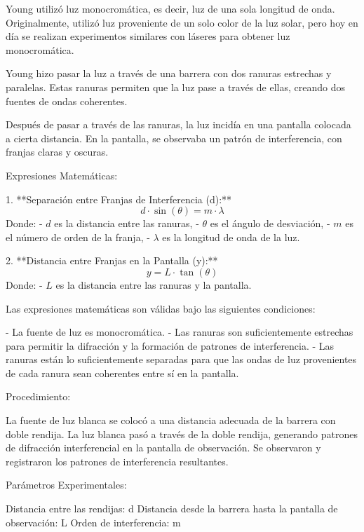 \documentclass[a4paper,12pt]{article}
\begin{document}
    Young utilizó luz monocromática, es decir, luz de una sola longitud de onda. Originalmente, utilizó luz proveniente de un solo color de la luz solar, pero hoy en día se realizan experimentos similares con láseres para obtener luz monocromática.

    Young hizo pasar la luz a través de una barrera con dos ranuras estrechas y paralelas. Estas ranuras permiten que la luz pase a través de ellas, creando dos fuentes de ondas coherentes.

    Después de pasar a través de las ranuras, la luz incidía en una pantalla colocada a cierta distancia. En la pantalla, se observaba un patrón de interferencia, con franjas claras y oscuras.

Expresiones Matemáticas:

1. **Separación entre Franjas de Interferencia (d):**
   \[ d \cdot \sin(\theta) = m \cdot \lambda \]
   Donde:
   - \( d \) es la distancia entre las ranuras,
   - \( \theta \) es el ángulo de desviación,
   - \( m \) es el número de orden de la franja,
   - \( \lambda \) es la longitud de onda de la luz.

2. **Distancia entre Franjas en la Pantalla (y):**
   \[ y = L \cdot \tan(\theta) \]
   Donde:
   - \( L \) es la distancia entre las ranuras y la pantalla.

Las expresiones matemáticas son válidas bajo las siguientes condiciones:

- La fuente de luz es monocromática.
- Las ranuras son suficientemente estrechas para permitir la difracción y la formación de patrones de interferencia.
- Las ranuras están lo suficientemente separadas para que las ondas de luz provenientes de cada ranura sean coherentes entre sí en la pantalla.

Procedimiento:

    La fuente de luz blanca se colocó a una distancia adecuada de la barrera con doble rendija.
    La luz blanca pasó a través de la doble rendija, generando patrones de difracción interferencial en la pantalla de observación.
    Se observaron y registraron los patrones de interferencia resultantes.

Parámetros Experimentales:

    Distancia entre las rendijas: d
    Distancia desde la barrera hasta la pantalla de observación: L
    Orden de interferencia: m

\end{document}
